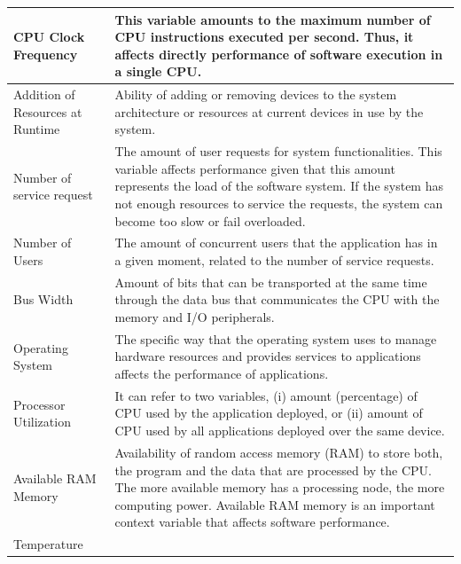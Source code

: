 {\begin{longtable}{|p{1.7in}|p{4.5in}|}
		CPU Clock Frequency                                    &                     
		This variable amounts to the maximum number of CPU instructions executed per second. Thus, it affects directly performance of software execution in a single CPU.          \\ \hline
		Addition of Resources at Runtime                    &                     
		Ability of adding or removing devices to the system architecture or resources at current devices in use by the system.          \\ \hline
		Number of service request                           &                     
		The amount of user requests for system functionalities. This variable affects performance given that this amount represents the load of the software system. If the system has not enough resources to service the requests, the system can become too slow or fail overloaded.            \\ \hline
		Number of Users                                     &                     
		The amount of concurrent users that the application has in a given moment, related to the number of service requests.          \\ \hline
		Bus Width                                           &                     
		Amount of bits that can be transported at the same time through the data bus that communicates the CPU with the memory and I/O peripherals.          \\ \hline
		Operating System                                    &                     
		The specific way that the operating system uses to manage hardware resources and provides services to applications affects the performance of applications.          \\ \hline
		Processor Utilization                               &                     
		It can refer to two variables, (i) amount (percentage) of CPU used by the application deployed, or (ii) amount of CPU used by all applications deployed over the same device.           \\ \hline
		Available RAM Memory                                 &                     
		Availability of random access memory (RAM) to store both, the program and the data that are processed by the CPU. The more available memory has a processing node, the more computing power. Available RAM memory is an important context variable that affects software performance.             \\ \hline
		Temperature                                         &                     

\end{longtable}}
